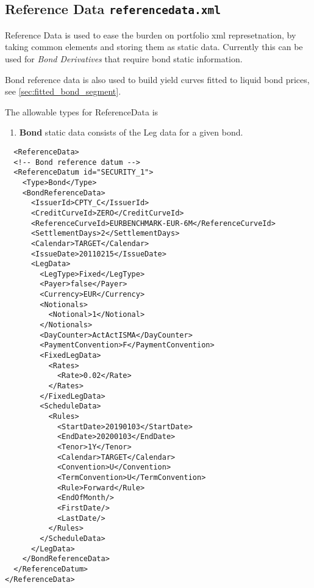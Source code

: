 \subsection{Reference Data {\tt referencedata.xml}}
\label{sec:referencedata}

Reference Data is used to ease the burden on portfolio xml represetnation, by taking common elements and storing them as
static data. Currently this can be used for \textit{Bond Derivatives} that require bond static information.

Bond reference data is also used to build yield curves fitted to liquid bond prices, see \ref{sec:fitted_bond_segment}.

The allowable types for ReferenceData is
\begin{enumerate}
\item \textbf{Bond} static data consists of the Leg data for a given bond.
\end{enumerate}

\begin{verbatim}
  <ReferenceData>
  <!-- Bond reference datum -->
  <ReferenceDatum id="SECURITY_1">
    <Type>Bond</Type>
    <BondReferenceData>
      <IssuerId>CPTY_C</IssuerId>
      <CreditCurveId>ZERO</CreditCurveId>
      <ReferenceCurveId>EURBENCHMARK-EUR-6M</ReferenceCurveId>
      <SettlementDays>2</SettlementDays>
      <Calendar>TARGET</Calendar>
      <IssueDate>20110215</IssueDate>
      <LegData>
        <LegType>Fixed</LegType>
        <Payer>false</Payer>
        <Currency>EUR</Currency>
        <Notionals>
          <Notional>1</Notional>
        </Notionals>
        <DayCounter>ActActISMA</DayCounter>
        <PaymentConvention>F</PaymentConvention>
        <FixedLegData>
          <Rates>
            <Rate>0.02</Rate>
          </Rates>
        </FixedLegData>
        <ScheduleData>
          <Rules>
            <StartDate>20190103</StartDate>
            <EndDate>20200103</EndDate>
            <Tenor>1Y</Tenor>
            <Calendar>TARGET</Calendar>
            <Convention>U</Convention>
            <TermConvention>U</TermConvention>
            <Rule>Forward</Rule>
            <EndOfMonth/>
            <FirstDate/>
            <LastDate/>
          </Rules>
        </ScheduleData>
      </LegData>
    </BondReferenceData>
  </ReferenceDatum>
</ReferenceData>
\end{verbatim}
